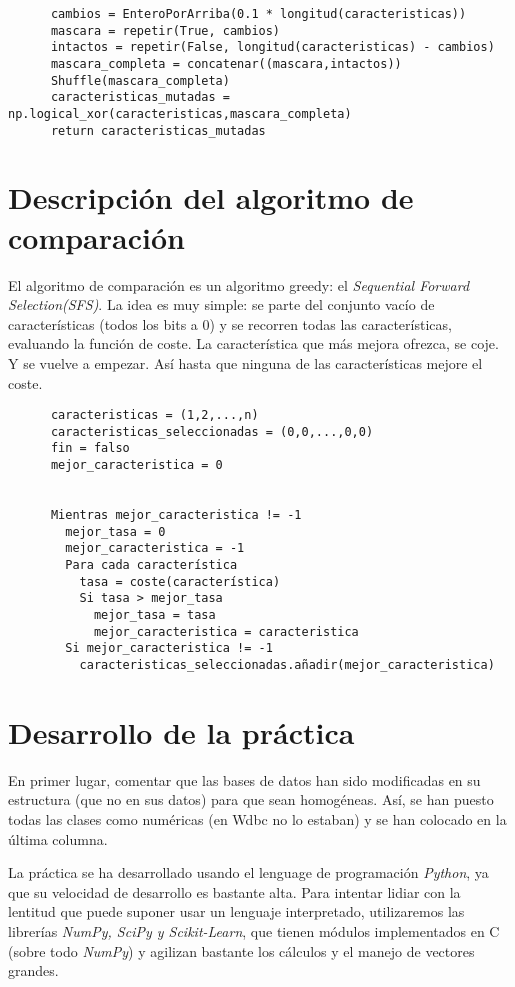 \documentclass[a4paper, 11pt]{article}
\begin{document}
    \begin{verbatim}
      cambios = EnteroPorArriba(0.1 * longitud(caracteristicas))
      mascara = repetir(True, cambios)
      intactos = repetir(False, longitud(caracteristicas) - cambios)
      mascara_completa = concatenar((mascara,intactos))
      Shuffle(mascara_completa)
      caracteristicas_mutadas = np.logical_xor(caracteristicas,mascara_completa)
      return caracteristicas_mutadas
    \end{verbatim}
  \section{Descripción del algoritmo de comparación}
    El algoritmo de comparación es un algoritmo greedy: el \emph{Sequential Forward Selection(SFS)}. La idea es muy simple: se parte del conjunto vacío de características (todos los bits a 0) y se recorren todas las características, evaluando la función de coste. La característica que más mejora ofrezca, se coje. Y se vuelve a empezar. Así hasta que ninguna de las características mejore el coste.

    \begin{verbatim}
      caracteristicas = (1,2,...,n)
      caracteristicas_seleccionadas = (0,0,...,0,0)
      fin = falso
      mejor_caracteristica = 0


      Mientras mejor_caracteristica != -1
        mejor_tasa = 0
        mejor_caracteristica = -1
        Para cada característica
          tasa = coste(característica)
          Si tasa > mejor_tasa
            mejor_tasa = tasa
            mejor_caracteristica = caracteristica
        Si mejor_caracteristica != -1
          caracteristicas_seleccionadas.añadir(mejor_caracteristica)
    \end{verbatim}
  \section{Desarrollo de la práctica}
    En primer lugar, comentar que las bases de datos han sido modificadas en su estructura (que no en sus datos) para que sean homogéneas. Así, se han puesto todas las clases como numéricas (en Wdbc no lo estaban) y se han colocado en la última columna.

    La práctica se ha desarrollado usando el lenguage de programación \emph{Python}, ya que su velocidad de desarrollo es bastante alta. Para intentar lidiar con la lentitud que puede suponer usar un lenguaje interpretado, utilizaremos las librerías \emph{NumPy, SciPy y Scikit-Learn}, que tienen módulos implementados en C (sobre todo \emph{NumPy}) y agilizan bastante los cálculos y el manejo de vectores grandes.
\end{document}
